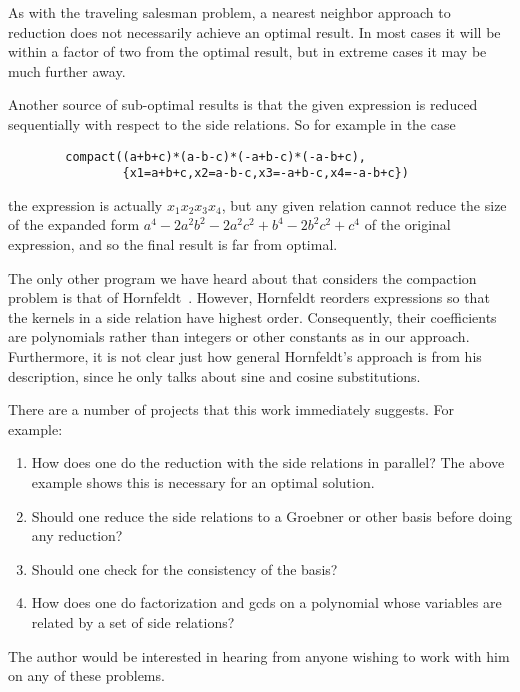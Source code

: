 As with the traveling salesman problem, a nearest neighbor approach to
reduction does not necessarily achieve an optimal result.  In most cases
it will be within a factor of two from the optimal result, but in extreme
cases it may be much further away.

Another source of sub-optimal results is that the given expression
is reduced sequentially with respect to the side relations.  So for
example in the case

\begin{verbatim}
        compact((a+b+c)*(a-b-c)*(-a+b-c)*(-a-b+c),
                {x1=a+b+c,x2=a-b-c,x3=-a+b-c,x4=-a-b+c})
\end{verbatim}

the expression is actually $x_{1}x_{2}x_{3}x_{4}$, but any given relation
cannot reduce the size of the expanded form
$a^{4}-2a^{2}b^{2}-2a^{2}c^{2}+b^{4}-2b^{2}c^{2}+c^{4}$
of the original expression, and so the final result is far from optimal.

The only other program we have heard about that considers the compaction
problem is that of Hornfeldt~\cite{Hornfeldt:82}.
However, Hornfeldt reorders expressions so that the kernels in a side
relation have highest order.  Consequently, their coefficients are
polynomials rather than integers or other constants as in our approach.
Furthermore, it is not clear just how general Hornfeldt's approach is from
his description, since he only talks about sine and cosine substitutions.

There are a number of projects that this work immediately suggests.  For
example:

\begin{enumerate}
\item How does one do the reduction with the side relations in parallel?
The above example shows this is necessary for an optimal solution.

\item Should one reduce the side relations to a Groebner or other basis
before doing any reduction?

\item Should one check for the consistency of the basis?

\item How does one do factorization and gcds on a polynomial whose
variables are related by a set of side relations?
\end{enumerate}

The author would be interested in hearing from anyone wishing to work with
him on any of these problems.



